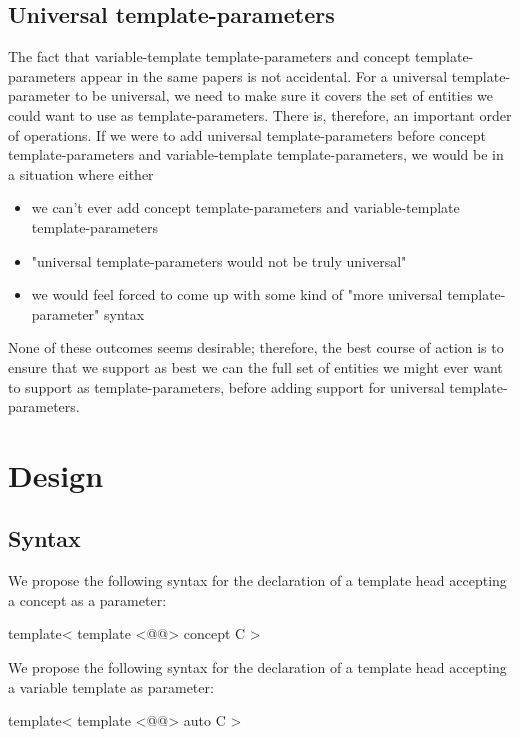 \documentclass{wg21}
\begin{document}
\subsection{Universal template-parameters}

The fact that variable-template template-parameters and concept template-parameters appear in the same papers is not accidental.
For a universal template-parameter to be universal, we need to make sure it covers the set of entities we could want to use as template-parameters.
There is, therefore, an important order of operations.
If we were to add universal template-parameters before concept template-parameters and variable-template template-parameters, we would be in a situation where either
\begin{itemize}
\item we can't ever add concept template-parameters and variable-template template-parameters
\item "universal template-parameters would not be truly universal"
\item we would feel forced to come up with some kind of "more universal template-parameter" syntax
\end{itemize}

None of these outcomes seems desirable; therefore, the best course of action is to ensure that we
support as best we can the full set of entities we might ever want to support as template-parameters, before adding support for universal template-parameters.

\section{Design}

\subsection{Syntax}

We propose the following syntax for the declaration of a template head accepting a concept as a parameter:

\begin{colorblock}
template<
    template <@@> concept C
>
\end{colorblock}

We propose the following syntax for the declaration of a template head accepting a variable template as parameter:

\begin{colorblock}
template<
    template <@@> auto C
>
\end{colorblock}
\end{document}
